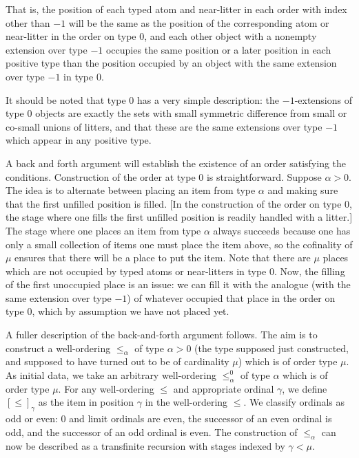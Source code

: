 \documentclass[112pt]{article}
\begin{document}
\begin{description}
\begin{enumerate}
That is, the position of each typed atom and near-litter in each order with index other than $-1$ will be the same as the position of the corresponding atom or near-litter in the order on type 0, and each other object with a nonempty extension over type $-1$ occupies the same position or a later position in each positive type than the position occupied by an object with the same extension over type $-1$ in type 0.

\end{enumerate}

   It should be noted that type 0 has a very simple description:  the $-1$-extensions of type 0 objects are exactly the sets with small symmetric difference from small or co-small unions of litters, and that these are the same extensions over type $-1$ which appear in any positive type.

A back and forth argument will establish the existence of an order satisfying the conditions.  Construction of the order at type 0 is straightforward.  Suppose $\alpha>0$.
The idea is to alternate between placing an item from type $\alpha$ and making sure that the first unfilled position is filled.  [In the construction of the order on type 0, the stage where one fills the first unfilled position is readily handled with a litter.] The stage where one places an item from type $\alpha$ always succeeds because one has only a small collection of items one must place the item above, so the cofinality of $\mu$ ensures that there will be a place to put the item.  Note that there are $\mu$ places which are not occupied by typed atoms or near-litters in type 0.  Now, the filling of the first unoccupied place is an issue:
we can fill it with the analogue (with the same extension over type $-1$) of whatever occupied that place in the order on type 0, which by assumption we have not placed yet.  

A fuller description of the back-and-forth argument follows.  The aim is to construct a well-ordering $\leq_\alpha$ of type $\alpha>0$ (the type supposed just constructed, and supposed to have turned out to be of cardinality $\mu$) which is of order type $\mu$.  As initial data, we take an arbitrary well-ordering $\leq^0_\alpha$ of type $\alpha$ which is of order type $\mu$.  For any well-ordering $\leq$ and appropriate ordinal $\gamma$, we define $[\leq]_\gamma$ as the item in position $\gamma$ in the well-ordering $\leq$.  We classify ordinals as odd or even:  0 and limit ordinals are even, the successor of an even ordinal is odd, and the successor of an odd ordinal is even.  The construction of $\leq_\alpha$ can now be described as a transfinite recursion with stages indexed by $\gamma<\mu$.  


\end{description}
\end{document}
